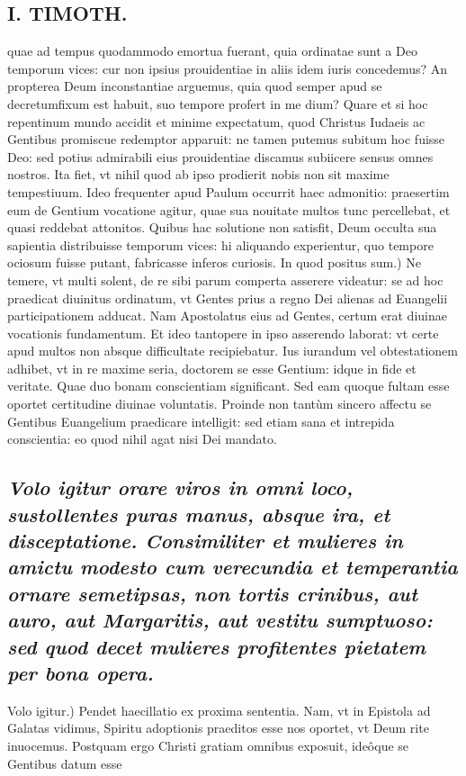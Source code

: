 \documentclass{article}
\begin{document}
\begin{pages}
\section*{I. TIMOTH. }
\marginpar{[ p.24 ]}\pstart quae ad tempus quodammodo emortua fuerant, quia ordinatae sunt a Deo temporum vices: cur non ipsius prouidentiae in aliis idem iuris concedemus? An propterea Deum inconstantiae arguemus, quia quod semper apud se decretumfixum est habuit, suo tempore profert in me dium? Quare et si hoc repentinum mundo accidit et minime expectatum, quod Christus Iudaeis ac Gentibus promiscue redemptor apparuit: ne tamen putemus subitum hoc fuisse Deo: sed potius admirabili eius prouidentiae discamus subiicere sensus omnes nostros. Ita fiet, vt nihil quod ab ipso prodierit nobis non sit maxime tempestiuum. Ideo frequenter apud Paulum occurrit haec admonitio: praesertim eum de Gentium vocatione agitur, quae sua nouitate multos tunc percellebat, et quasi reddebat attonitos. Quibus hac solutione non satisfit, Deum occulta sua sapientia distribuisse temporum vices: hi aliquando experientur, quo tempore ociosum fuisse putant, fabricasse inferos curiosis.  \pend\pstart In quod positus sum.) Ne temere, vt multi solent, de re sibi parum comperta asserere videatur: se ad hoc praedicat diuinitus ordinatum, vt Gentes prius a regno Dei alienas ad Euangelii participationem adducat. Nam Apostolatus eius ad Gentes, certum erat diuinae vocationis fundamentum. Et ideo tantopere in ipso asserendo laborat: vt certe apud multos non absque difficultate recipiebatur. Ius iurandum vel obtestationem adhibet, vt in re maxime seria, doctorem se esse Gentium: idque in fide et veritate. Quae duo bonam conscientiam significant. Sed eam quoque fultam esse oportet certitudine diuinae voluntatis. Proinde non tantùm sincero affectu se Gentibus Euangelium praedicare intelligit: sed etiam sana et intrepida conscientia: eo quod nihil agat nisi Dei mandato.  \pend
{}
{}
\subsection*{\textit{Volo igitur orare viros in omni loco, sustollentes puras manus, absque ira, et disceptatione. Consimiliter et mulieres in amictu modesto cum verecundia et temperantia ornare semetipsas, non tortis crinibus, aut auro, aut Margaritis, aut vestitu sumptuoso: sed quod decet mulieres profitentes pietatem per bona opera. }}\pstart Volo igitur.) Pendet haecillatio ex proxima sententia. Nam, vt in Epistola ad Galatas vidimus, Spiritu adoptionis praeditos esse nos oportet, vt Deum rite inuocemus. Postquam ergo Christi gratiam omnibus exposuit, ideôque se Gentibus datum esse  \pend

\end{pages}
\end{document}
